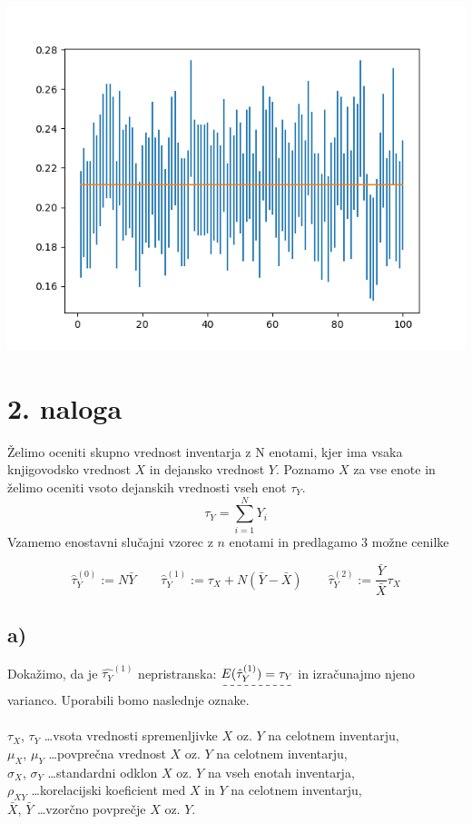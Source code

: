 \documentclass[A4paper, 11pt]{article}
\begin{document}
\includegraphics[scale=0.8]{Kibergrad_2}



\section*{2. naloga}

Želimo oceniti skupno vrednost inventarja z N enotami, kjer ima vsaka knjigovodsko vrednost $X$ in dejansko vrednost $Y$. Poznamo $X$ za vse enote in želimo oceniti vsoto dejanskih vrednosti vseh enot $\tau_Y$.
\[ \tau_Y = \sum_{i=1}^{N} Y_i \]
Vzamemo enostavni slučajni vzorec z $n$ enotami in predlagamo 3 možne cenilke

\[ \hat{\tau}_Y ^ {(0)} := N  \bar{Y} \qquad \hat{\tau}_Y ^ {(1)} := \tau_X + N ( \bar{Y} - \bar{X}) \qquad \hat{\tau}_Y ^ {(2)} := \frac{\bar{Y}}{\bar{X}} \tau_X \]


\subsection*{a)}
Dokažimo, da je $\hat{\tau_Y} ^ {(1)}$ nepristranska: $\dashuline{ E(\hat{\tau}_Y ^ {(1)}) = \tau_Y}$ in izračunajmo njeno varianco. Uporabili bomo naslednje oznake. \\
\\
$\tau_X$, $\tau_Y$ \ldots vsota vrednosti spremenljivke $X$ oz. $Y$ na celotnem inventarju, \\
$\mu_X$, $\mu_Y$ \ldots povprečna vrednost $X$ oz. $Y$ na celotnem inventarju, \\
$\sigma_X$, $\sigma_Y$ \ldots standardni odklon $X$ oz. $Y$ na vseh enotah inventarja, \\
$\rho_{XY}$ \ldots korelacijski koeficient med $X$ in $Y$ na celotnem inventarju, \\
$\bar{X}$, $\bar{Y}$ \ldots vzorčno povprečje $X$ oz. $Y$.
\end{document}

